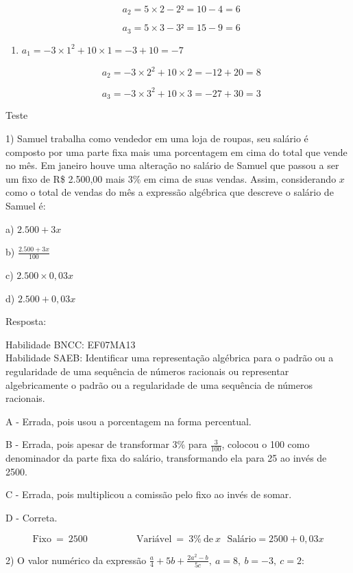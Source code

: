 \[\text{\ \ \ \ \ }a_{2} = 5 \times 2 - 2² = 10 - 4 = 6\]

\[{\text{\ \ \ \ \ }a}_{3} = 5 \times 3 - 3² = 15 - 9 = 6\]

\begin{enumerate}
\def\labelenumi{\alph{enumi})}
\setcounter{enumi}{3}
\tightlist
\item
  \(a_{1} = - 3 \times 1^{2} + 10 \times 1 = - 3 + 10 = - 7\)
\end{enumerate}

\[\text{\ \ \ \ \ }a_{2} = - 3 \times 2^{2} + 10 \times 2 = - 12 + 20 = 8\]

\[{\text{\ \ \ \ \ }a}_{3} = - 3 \times 3^{2} + 10 \times 3 = - 27 + 30 = 3\]

Teste

1) Samuel trabalha como vendedor em uma loja de roupas, seu salário é
composto por uma parte fixa mais uma porcentagem em cima do total que
vende no mês. Em janeiro houve uma alteração no salário de Samuel que
passou a ser um fixo de R\$ 2.500,00 mais 3\% em cima de suas vendas.
Assim, considerando \(x\) como o total de vendas do mês a expressão
algébrica que descreve o salário de Samuel é:

a) \(2.500 + 3x\)

b) \(\frac{2.500 + 3x}{100}\)

c) \(2.500 \times 0,03x\)

d) \(2.500 + 0,03x\)

Resposta:

Habilidade BNCC: EF07MA13\\
Habilidade SAEB: Identificar uma representação algébrica para o padrão
ou a regularidade de uma sequência de números racionais ou representar
algebricamente o padrão ou a regularidade de uma sequência de números
racionais.

A - Errada, pois usou a porcentagem na forma percentual.

B - Errada, pois apesar de transformar 3\% para \(\frac{3}{100}\),
colocou o 100 como denominador da parte fixa do salário, transformando
ela para 25 ao invés de 2500.

C - Errada, pois multiplicou a comissão pelo fixo ao invés de somar.

D - Correta.

\[\text{Fixo}\  = \ 2500\ \ \ \ \ \ \ \ \ \ \ \ \ \ \ \ \ \ \ \ \ \ \ \text{Vari}á\text{vel}\  = \ 3\%\ \text{de}\ x\text{\ \ \ \ \ \ \ \ \ \ \ \ \ \ \ \ \ }\text{Sal}á\text{rio} = 2500 + 0,03x\]

2) O valor numérico da expressão
\(\frac{a}{4} + 5b + \frac{2a^{2} - b}{5c},\ a = 8,\ b = - 3,\ c = 2\):

